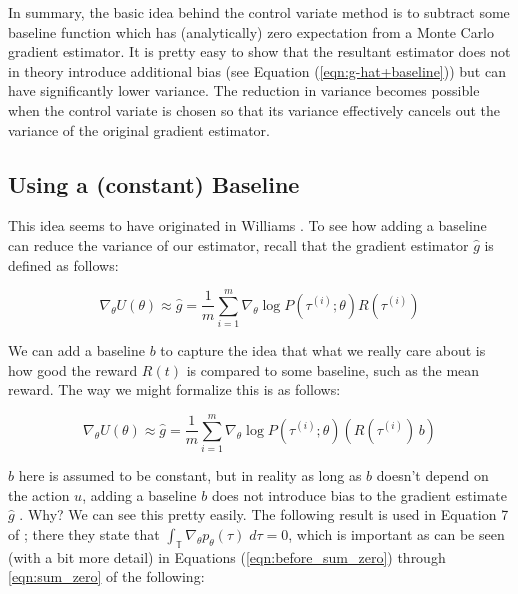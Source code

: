 \documentclass[11pt, oneside]{article}					%
\begin{document}
\bigskip
\noindent
In summary, the basic idea behind the control variate method is
to subtract some baseline function which has (analytically) zero
expectation from a Monte Carlo gradient estimator.  It is pretty
easy to show that the resultant estimator does not in theory
introduce additional bias (see Equation
(\ref{eqn:g-hat+baseline})) but can have significantly lower
variance. The reduction in variance becomes possible when the
control variate is chosen so that its variance effectively
cancels out the variance of the original gradient estimator.

\subsection{Using a (constant) Baseline}
\label{sec:baseline}
This idea seems to have originated in Williams
\cite{Williams1992}. To see how adding a baseline can reduce the
variance of our estimator, recall that the gradient estimator
$\hat{g}$ is defined as follows:

\begin{equation}
\nabla_\theta U(\theta) \approx \hat{g} = \frac{1}{m}
\sum\limits_{i = 1}^{m} \nabla_{\theta} \log  P(\tau^{(i)} ;
\theta) R(\tau^{(i)}) 
\end{equation}

\bigskip
\noindent
We can add a baseline $b$ to capture the idea that what we really
care about is how good the reward $R(t)$ is compared to some
baseline, such as the mean reward.  The way we might formalize
this is as follows:

\begin{equation*}
\nabla_\theta U(\theta) \approx \hat{g} = \frac{1}{m} 
\sum\limits_{i = 1}^{m} \nabla_{\theta} \log  P(\tau^{(i)} ;
\theta) (R(\tau^{(i)}) \, b)
\end{equation*}

\bigskip
\noindent
$b$ here is assumed to be constant, but in reality as long as $b$
doesn't depend on the action $u$, adding a baseline $b$ does not
introduce bias to the gradient estimate $\hat{g}$
\cite{Williams1992}. Why? We can see this pretty easily. The
following result is used in Equation 7 of \cite{Peters:2006fk};
there they state that $\int_{\mathbb{T}} \nabla_{\theta}
p_{\theta}(\tau) \; d\tau = 0$, which is important as can be seen
(with a bit more detail) in Equations (\ref{eqn:before_sum_zero})
through \ref{eqn:sum_zero} of the following:
\end{document}
